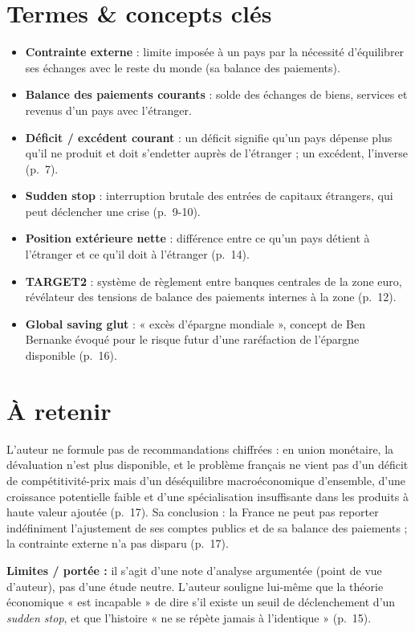 \documentclass[11pt,a4paper]{article}
\begin{document}
\section{Termes \& concepts clés}
\begin{itemize}
  \item \textbf{Contrainte externe} : limite imposée à un pays par la nécessité
  d'équilibrer ses échanges avec le reste du monde (sa balance des paiements).
  \item \textbf{Balance des paiements courants} : solde des échanges de biens,
  services et revenus d'un pays avec l'étranger.
  \item \textbf{Déficit / excédent courant} : un déficit signifie qu'un pays dépense
  plus qu'il ne produit et doit s'endetter auprès de l'étranger ; un excédent,
  l'inverse (p.~7).
  \item \textbf{Sudden stop} : interruption brutale des entrées de capitaux
  étrangers, qui peut déclencher une crise (p.~9-10).
  \item \textbf{Position extérieure nette} : différence entre ce qu'un pays détient
  à l'étranger et ce qu'il doit à l'étranger (p.~14).
  \item \textbf{TARGET2} : système de règlement entre banques centrales de la zone
  euro, révélateur des tensions de balance des paiements internes à la zone (p.~12).
  \item \textbf{Global saving glut} : « excès d'épargne mondiale », concept de Ben
  Bernanke évoqué pour le risque futur d'une raréfaction de l'épargne disponible
  (p.~16).
\end{itemize}

\section{À retenir}
L'auteur ne formule pas de recommandations chiffrées : en union monétaire, la
dévaluation n'est plus disponible, et le problème français ne vient pas d'un
déficit de compétitivité-prix mais d'un déséquilibre macroéconomique d'ensemble,
d'une croissance potentielle faible et d'une spécialisation insuffisante dans les
produits à haute valeur ajoutée (p.~17). Sa conclusion : la France ne peut pas
reporter indéfiniment l'ajustement de ses comptes publics et de sa balance des
paiements ; la contrainte externe n'a pas disparu (p.~17).

\vspace{0.3em}
\textbf{Limites / portée :} il s'agit d'une note d'analyse argumentée (point de vue
d'auteur), pas d'une étude neutre. L'auteur souligne lui-même que la théorie
économique « est incapable » de dire s'il existe un seuil de déclenchement d'un
\textit{sudden stop}, et que l'histoire « ne se répète jamais à l'identique » (p.~15).
\end{document}
